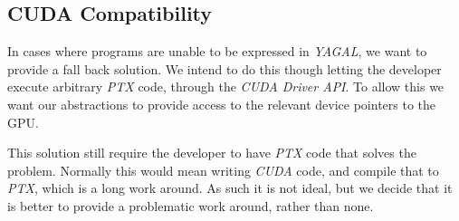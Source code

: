 
\subsection{CUDA Compatibility}
In cases where programs are unable to be expressed in \textit{YAGAL}, we want to provide a fall back solution. We intend to do this though letting the developer execute arbitrary \textit{PTX} code, through the \textit{CUDA Driver API}. To allow this we want our abstractions to provide access to the relevant device pointers to the GPU.

This solution still require the developer to have \textit{PTX} code that solves the problem. Normally this would mean writing \textit{CUDA} code, and compile that to \textit{PTX}, which is a long work around. As such it is not ideal, but we decide that it is better to provide a problematic work around, rather than none.
